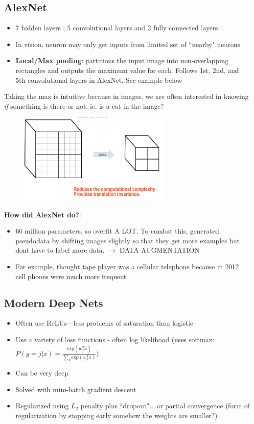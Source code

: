 \documentclass[a4paper]{article}\usepackage[]{graphicx}\usepackage[]{color}
\begin{document}
\subsection{AlexNet}

\begin{itemize}
\item 7 hidden layers ; 5 convolutional layers and 2 fully connected layers
\item In vision, neuron may only get inputs from limited set of ``nearby" neurons
\item \textbf{Local/Max pooling}: partitions the input image into non-overlapping rectangles and outputs the maximum value for each. Follows 1st, 2nd, and 5th convolutional layers in AlexNet. See example below
\end{itemize}

Taking the max is intuitive because in images, we are often interested in knowing \emph{if} something is there or not. ie. is a cat in the image?

\begin{figure}[H]
\centering
\includegraphics[width=3in]{cnn_pooling.png}
\end{figure}

\textbf{How did AlexNet do?}:
\begin{itemize}
\item 60 million parameters, so overfit A LOT. To combat this, generated pseudodata by shifting images slightly so that they get more examples but dont have to label more data. $\rightarrow$ DATA AUGMENTATION
\item For example, thought tape player was a cellular telephone because in 2012 cell phones were much more frequent
\end{itemize}

\subsection{Modern Deep Nets}

\begin{itemize}
\item Often use ReLUs - less problems of saturation than logistic
\item Use a variety of loss functions - often log likelihood (uses softmax: $P(y=j|x)=\frac{\text{exp}(w_j^Tx)}{\sum_k \text{exp}(w_k^Tx)})$
\item Can be very deep
\item Solved with mini-batch gradient descent
\item Regularized using $L_2$ penalty plus ``dropout"....or partial convergence (form of regularization by stopping early somehow the weights are smaller?)
\end{itemize} 
\end{document}
